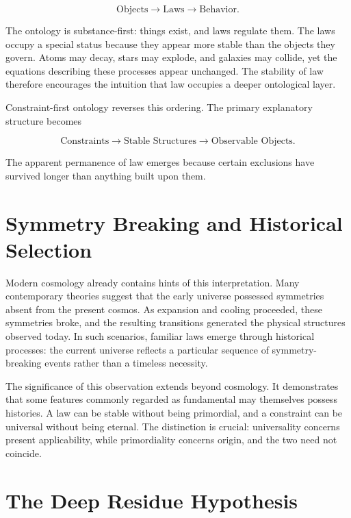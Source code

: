 \documentclass[11pt,oneside]{book}
\theoremstyle{plain}
\theoremstyle{definition}
\theoremstyle{remark}
\begin{document}
\begin{equation}
\text{Objects}
\longrightarrow
\text{Laws}
\longrightarrow
\text{Behavior}.
\end{equation}

The ontology is substance-first: things exist, and laws regulate them. The laws occupy a special status because they appear more stable than the objects they govern. Atoms may decay, stars may explode, and galaxies may collide, yet the equations describing these processes appear unchanged. The stability of law therefore encourages the intuition that law occupies a deeper ontological layer.

Constraint-first ontology reverses this ordering. The primary explanatory structure becomes

\begin{equation}
\text{Constraints}
\longrightarrow
\text{Stable Structures}
\longrightarrow
\text{Observable Objects}.
\end{equation}

The apparent permanence of law emerges because certain exclusions have survived longer than anything built upon them.

\section{Symmetry Breaking and Historical Selection}

Modern cosmology already contains hints of this interpretation. Many contemporary theories suggest that the early universe possessed symmetries absent from the present cosmos. As expansion and cooling proceeded, these symmetries broke, and the resulting transitions generated the physical structures observed today. In such scenarios, familiar laws emerge through historical processes: the current universe reflects a particular sequence of symmetry-breaking events rather than a timeless necessity.

The significance of this observation extends beyond cosmology. It demonstrates that some features commonly regarded as fundamental may themselves possess histories. A law can be stable without being primordial, and a constraint can be universal without being eternal. The distinction is crucial: universality concerns present applicability, while primordiality concerns origin, and the two need not coincide.

\section{The Deep Residue Hypothesis}
\end{document}
